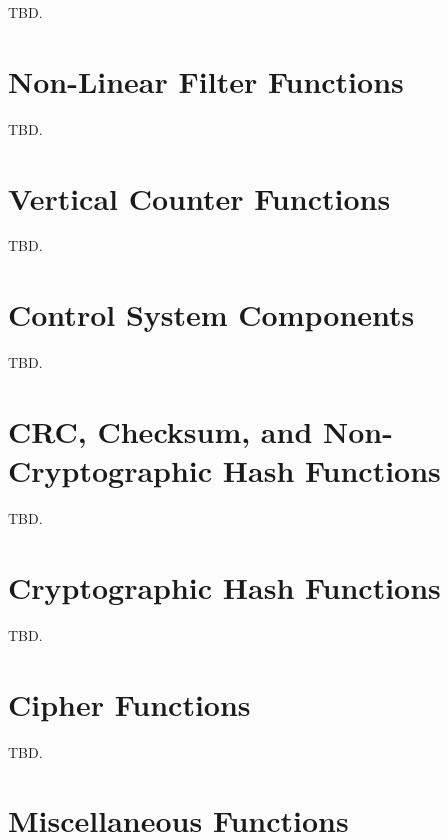 TBD.

\section{Non-Linear Filter Functions}
\label{cfrf2:snfi2}

TBD.

\section{Vertical Counter Functions}
\label{cfrf2:svco2}

TBD.

\section{Control System Components}
\label{cfrf2:scso2}

TBD.

\section{CRC, Checksum, and Non-Cryptographic Hash Functions}
\label{cfrf2:scrc2}

TBD.

\section{Cryptographic Hash Functions}
\label{cfrf2:scrh2}

TBD.

\section{Cipher Functions}
\label{cfrf2:scip2}

TBD.

\section{Miscellaneous Functions}
\label{cfrf2:smsc2}

